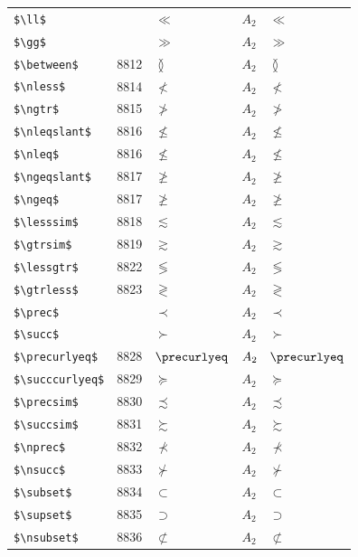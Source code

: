 ﻿\documentclass{article}
\begin{document}
\begin{table}
\begin{center}
\begin{tabular}{llll}
 \verb#$\ll$#          &         & $\ll$          & $A_2\quad \ll$\\
 \verb#$\gg$#          &         & $\gg$          & $A_2\quad \gg$\\
 \verb#$\between$#     & 8812    & $\between$     & $A_2\quad \between$\\
 \verb#$\nless$#       & 8814    & $\nless$       & $A_2\quad \nless$\\
 \verb#$\ngtr$#        & 8815    & $\ngtr$        & $A_2\quad \ngtr$\\
 \verb#$\nleqslant$#   & 8816    & $\nleqslant$   & $A_2\quad \nleqslant$\\
 \verb#$\nleq$#        & 8816    & $\nleq$        & $A_2\quad \nleq$\\
 \verb#$\ngeqslant$#   & 8817    & $\ngeqslant$   & $A_2\quad \ngeqslant$\\
 \verb#$\ngeq$#        & 8817    & $\ngeq$        & $A_2\quad \ngeq$\\
 \verb#$\lesssim$#     & 8818    & $\lesssim$     & $A_2\quad \lesssim$\\
 \verb#$\gtrsim$#      & 8819    & $\gtrsim$      & $A_2\quad \gtrsim$\\
 \verb#$\lessgtr$#     & 8822    & $\lessgtr$     & $A_2\quad \lessgtr$\\
 \verb#$\gtrless$#     & 8823    & $\gtrless$     & $A_2\quad \gtrless$\\
 \verb#$\prec$#        &         & $\prec$        & $A_2\quad \prec$\\
 \verb#$\succ$#        &         & $\succ$        & $A_2\quad \succ$\\
 \verb#$\precurlyeq$#  & 8828    & $\precurlyeq$  & $A_2\quad \precurlyeq$\\
 \verb#$\succcurlyeq$# & 8829    & $\succcurlyeq$ & $A_2\quad \succcurlyeq$\\
 \verb#$\precsim$#     & 8830    & $\precsim$     & $A_2\quad \precsim$\\
 \verb#$\succsim$#     & 8831    & $\succsim$     & $A_2\quad \succsim$\\
 \verb#$\nprec$#       & 8832    & $\nprec$       & $A_2\quad \nprec$\\
 \verb#$\nsucc$#       & 8833    & $\nsucc$       & $A_2\quad \nsucc$\\
 \verb#$\subset$#      & 8834    & $\subset$      & $A_2\quad \subset$\\
 \verb#$\supset$#      & 8835    & $\supset$      & $A_2\quad \supset$\\
 \verb#$\nsubset$#     & 8836    & $\nsubset$     & $A_2\quad \nsubset$\\

\end{tabular}
\end{center}
\end{table}
\end{document}
